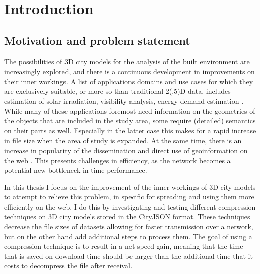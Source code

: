 
\chapter{Introduction}
\label{chap:introduction}

\section{Motivation and problem statement}
\label{sec:motivation}
The possibilities of 3D city models for the analysis of the built environment are increasingly explored, and there is a continuous development in improvements on their inner workings.
A list of applications domains and use cases for which they are exclusively suitable, or more so than traditional 2(.5)D data, includes estimation of solar irradiation, visibility analysis, energy demand estimation \citet{biljecki2015applications}.
While many of these applications foremost need information on the geometries of the objects that are included in the study area, some require (detailed) semantics on their parts as well.
Especially in the latter case this makes for a rapid increase in file size when the area of study is expanded.
At the same time, there is an increase in popularity of the dissemination and direct use of geoinformation on the web \citep{gislounge, Mango2017}.
This presents challenges in efficiency, as the network becomes a potential new bottleneck in time performance.

In this thesis I focus on the improvement of the inner workings of 3D city models to attempt to relieve this problem, in specific for spreading and using them more efficiently on the web.
I do this by investigating and testing different compression techniques on 3D city models stored in the CityJSON \citep{cityjsonspecs} format.
These techniques decrease the file sizes of datasets allowing for faster transmission over a network, but on the other hand add additional steps to process them.
The goal of using a compression technique is to result in a net speed gain, meaning that the time that is saved on download time should be larger than the additional time that it costs to decompress the file after receival.




